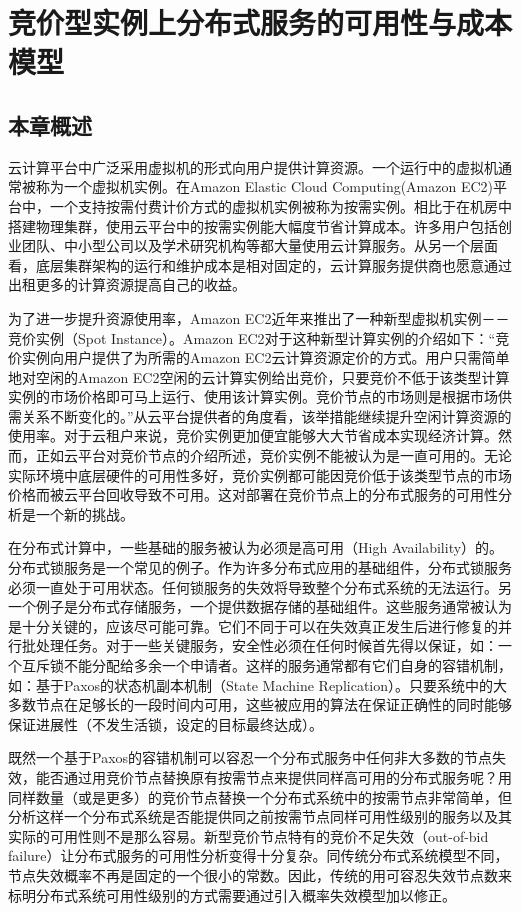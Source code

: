 \chapter{竞价型实例上分布式服务的可用性与成本模型}
\label{cha:jupiter}

\section{本章概述}
\label{sec:jupiter_intro}
云计算平台中广泛采用虚拟机的形式向用户提供计算资源。一个运行中的虚拟机通常被称为一个虚拟机实例。在Amazon Elastic Cloud Computing(Amazon EC2)平台中，一个支持按需付费计价方式的虚拟机实例被称为按需实例。相比于在机房中搭建物理集群，使用云平台中的按需实例能大幅度节省计算成本。许多用户包括创业团队、中小型公司以及学术研究机构等都大量使用云计算服务。从另一个层面看，底层集群架构的运行和维护成本是相对固定的，云计算服务提供商也愿意通过出租更多的计算资源提高自己的收益。

为了进一步提升资源使用率，Amazon EC2近年来推出了一种新型虚拟机实例－－竞价实例（Spot Instance）。Amazon EC2对于这种新型计算实例的介绍如下：``竞价实例向用户提供了为所需的Amazon EC2云计算资源定价的方式。用户只需简单地对空闲的Amazon EC2空闲的云计算实例给出竞价，只要竞价不低于该类型计算实例的市场价格即可马上运行、使用该计算实例。竞价节点的市场则是根据市场供需关系不断变化的。''从云平台提供者的角度看，该举措能继续提升空闲计算资源的使用率。对于云租户来说，竞价实例更加便宜能够大大节省成本实现经济计算。然而，正如云平台对竞价节点的介绍所述，竞价实例不能被认为是一直可用的。无论实际环境中底层硬件的可用性多好，竞价实例都可能因竞价低于该类型节点的市场价格而被云平台回收导致不可用。这对部署在竞价节点上的分布式服务的可用性分析是一个新的挑战。

在分布式计算中，一些基础的服务被认为必须是高可用（High Availability）的。分布式锁服务是一个常见的例子。作为许多分布式应用的基础组件，分布式锁服务必须一直处于可用状态。任何锁服务的失效将导致整个分布式系统的无法运行。另一个例子是分布式存储服务，一个提供数据存储的基础组件。这些服务通常被认为是十分关键的，应该尽可能可靠。它们不同于可以在失效真正发生后进行修复的并行批处理任务\cite{Liu:2011:CMC:2170444.2170450, 5975137, Yi:2010:RCS:1844768.1845343}。对于一些关键服务，安全性必须在任何时候首先得以保证，如：一个互斥锁不能分配给多余一个申请者。这样的服务通常都有它们自身的容错机制，如：基于Paxos的状态机副本机制（State Machine Replication）。只要系统中的大多数节点在足够长的一段时间内可用，这些被应用的算法在保证正确性的同时能够保证进展性（不发生活锁，设定的目标最终达成）。

既然一个基于Paxos的容错机制可以容忍一个分布式服务中任何非大多数的节点失效，能否通过用竞价节点替换原有按需节点来提供同样高可用的分布式服务呢？用同样数量（或是更多）的竞价节点替换一个分布式系统中的按需节点非常简单，但分析这样一个分布式系统是否能提供同之前按需节点同样可用性级别的服务以及其实际的可用性则不是那么容易。新型竞价节点特有的竞价不足失效（out-of-bid failure）让分布式服务的可用性分析变得十分复杂。同传统分布式系统模型不同，节点失效概率不再是固定的一个很小的常数。因此，传统的用可容忍失效节点数来标明分布式系统可用性级别的方式需要通过引入概率失效模型加以修正。

